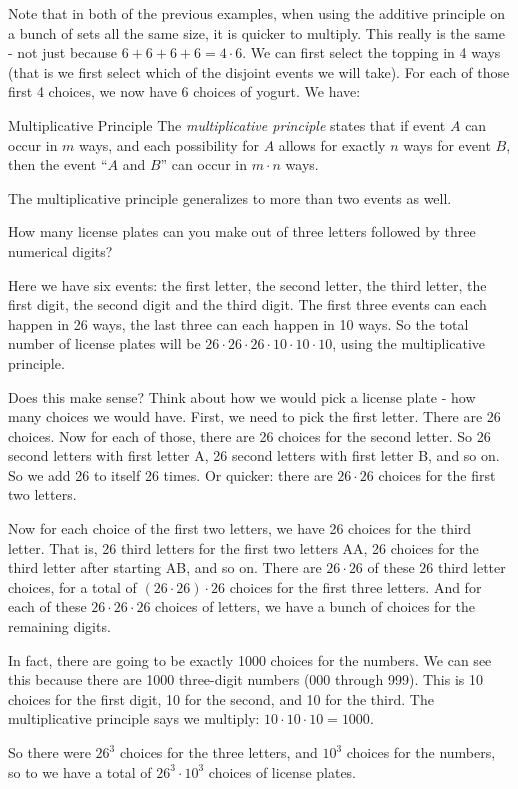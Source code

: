 \documentclass[12pt]{article}
\begin{document}
Note that in both of the previous examples, when using the additive principle on a bunch of sets all the same size, it is quicker to multiply.  This really is the same - not just because $6 + 6 + 6 + 6 = 4\cdot 6$.  We can first select the topping in 4 ways (that is we first select which of the disjoint events we will take).  For each of those first 4 choices, we now have 6 choices of yogurt.  We have:

\begin{defbox}{Multiplicative Principle}
  The {\em multiplicative principle} states that if event $A$ can occur in $m$ ways, and each possibility for $A$ allows for exactly $n$ ways for event $B$, then the event ``$A$ and $B$'' can occur in $m \cdot n$ ways.
\end{defbox}

The multiplicative principle generalizes to more than two events as well.

\begin{example}
  How many license plates can you make out of three letters followed by three numerical digits?
  
  \begin{solution}
    Here we have six events: the first letter, the second letter, the third letter, the first digit, the second digit and the third digit.  The first three events can each happen in 26 ways, the last three can each happen in 10 ways.  So the total number of license plates will be $26\cdot 26\cdot 26 \cdot 10 \cdot 10 \cdot 10$, using the multiplicative principle.
    
    Does this make sense?  Think about how we would pick a license plate - how many choices we would have.  First, we need to pick the first letter.  There are 26 choices.  Now for each of those, there are 26 choices for the second letter.  So 26 second letters with first letter A, 26 second letters with first letter B, and so on.  So we add 26 to itself 26 times.  Or quicker: there are $26 \cdot 26$ choices for the first two letters.  
    
    Now for each choice of the first two letters, we have 26 choices for the third letter.  That is, 26 third letters for the first two letters AA, 26 choices for the third letter after starting AB, and so on.  There are $26 \cdot 26$ of these $26$ third letter choices, for a total of $(26\cdot26)\cdot 26$ choices for the first three letters.  And for each of these $26\cdot26\cdot26$ choices of letters, we have a bunch of choices for the remaining digits.
    
    In fact, there are going to be exactly 1000 choices for the numbers.  We can see this because there are 1000 three-digit numbers (000 through 999).  This is 10 choices for the first digit, 10 for the second, and 10 for the third.  The multiplicative principle says we multiply: $10\cdot 10 \cdot 10 = 1000$.  
    
    So there were $26^3$ choices for the three letters, and $10^3$ choices for the numbers, so to we have a total of $26^3 \cdot 10^3$ choices of license plates.
  \end{solution}

\end{example}
\end{document}
